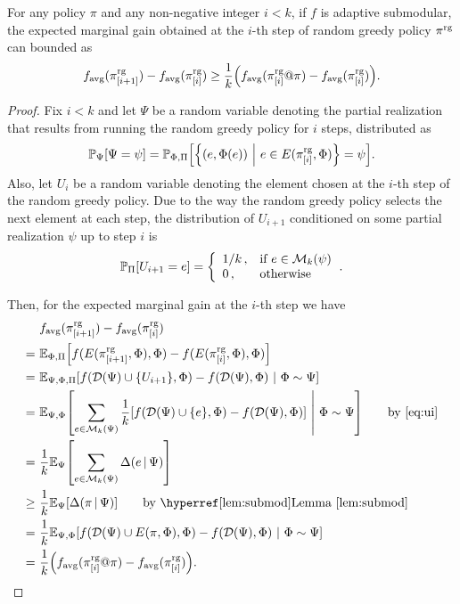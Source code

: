 \begin{lemma}\label{lem:mon_main}
  For any policy $\pi$ and any non-negative integer $i < k$, if $f$ is adaptive submodular, the expected marginal gain obtained at the $i$-th step of random greedy policy $\pi^{\textrm{rg}}$ can bounded as
  \begin{align*}
    \favg(\pigii) - \favg(\pigi) \geq \frac{1}{k}\left(\favg(\pigi @ \pi) - \favg(\pigi)\right).
  \end{align*}
\end{lemma}
\begin{proof}
  Fix $i < k$ and let $\Psi$ be a random variable denoting the partial realization that results from running the random greedy policy for $i$ steps, distributed as
  \begin{align*}
    \P[\Psi]{\Psi = \psi} = \P[\Phi, \Pi]{\sdef{\left(e, \Phi(e)\right)}{e \in E(\pigi, \Phi)} = \psi}.
  \end{align*}
  Also, let $U_i$ be a random variable denoting the element chosen at the $i$-th step of the random greedy policy. Due to the way the random greedy policy selects the next element at each step, the distribution of $U_{i+1}$ conditioned on some partial realization $\psi$ up to step $i$ is
  \begin{align}\label{eq:ui}
    \P[\Pi]{U_{i+1} = e} = \twopartdefo{1/k}{e \in \mathcal{M}_k(\psi)}{0}.
  \end{align}
  
  Then, for the expected marginal gain at the $i$-th step we have
  \begin{align*}
     &\ \favg(\pigii) - \favg(\pigi)\\
    =&\ \E[\Phi, \Pi]{f(E(\pigii, \Phi), \Phi) - f(E(\pigi, \Phi), \Phi)}\\
    =&\ \E[\Psi, \Phi, \Pi]{f(\dom(\Psi) \cup \{U_{i+1}\}, \Phi) - f(\dom(\Psi), \Phi)}[\Phi \sim \Psi]\\
    =&\ \E[\Psi, \Phi]{\sum_{e \in \mathcal{M}_k(\Psi)}\frac{1}{k}\left[f(\dom(\Psi) \cup \{e\}, \Phi) - f(\dom(\Psi), \Phi)\right]}[\Phi \sim \Psi] \tag*{by \eqref{eq:ui}}\\
    =&\ \frac{1}{k}\E[\Psi]{\sum_{e \in \mathcal{M}_k(\Psi)}\D{e}{\Psi}}\\
    \geq&\ \frac{1}{k}\E[\Psi]{\D{\pi}{\Psi}} \tag*{by~\lemmaref{lem:submod}}\\
    =&\ \frac{1}{k}\E[\Psi, \Phi]{f(\dom(\Psi) \cup E(\pi, \Phi), \Phi) - f(\dom(\Psi), \Phi)}[\Phi \sim \Psi]\\
    =& \ \frac{1}{k}\left(\favg(\pigi @ \pi) - \favg(\pigi)\right).
  \end{align*}
\end{proof}

